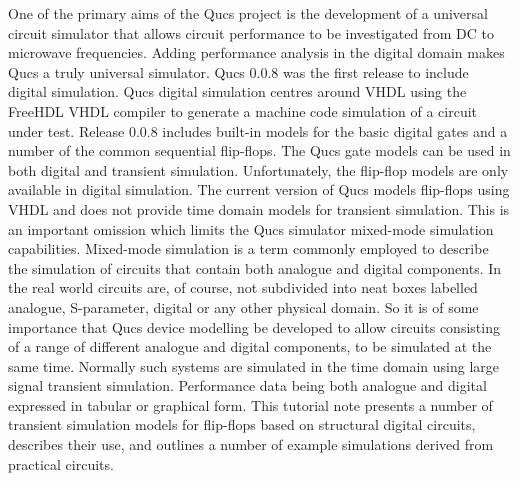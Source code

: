 %
%
%
%

\renewcommand{\thesubfigure}{\thefigure(\alph{subfigure})}
\makeatletter
  \renewcommand{\@thesubfigure}{\thesubfigure:\space}
  \renewcommand{\p@subfigure}{}
\makeatother

\renewcommand{\thesubtable}{\thetable(\alph{subtable})}
\makeatletter
  \renewcommand{\@thesubtable}{\thesubtable:\space}
  \renewcommand{\p@subtable}{}
\makeatother


One of the primary aims of the Qucs project is the development of a
universal circuit simulator that allows circuit performance to be
investigated from DC to microwave frequencies.  Adding performance
analysis in the digital domain makes Qucs a truly universal simulator.
Qucs 0.0.8 was the first release to include digital simulation.  Qucs
digital simulation centres around VHDL using the FreeHDL VHDL compiler
to generate a machine code si\-mu\-la\-tion of a circuit under
test. Release 0.0.8 includes built-in models for the basic digital
gates and a number of the common sequential flip-flops.  The Qucs gate
models can be used in both digital and transient simulation.
Unfortunately, the flip-flop models are only available in digital
simulation.  The current version of Qucs models flip-flops using VHDL
and does not provide time domain models for transient simulation. This
is an important omission which limits the Qucs simulator mixed-mode
simulation capabilities. Mixed-mode simulation is a term commonly
employed to describe the simulation of circuits that contain both
analogue and digital components.  In the real world circuits are, of
course, not subdivided into neat boxes labelled analogue, S-parameter,
digital or any other physical domain.  So it is of some importance
that Qucs device modelling be developed to allow circuits consisting
of a range of different analogue and digital components, to be
simulated at the same time.  Normally such systems are simulated in
the time domain using large signal transient simulation. Performance
data being both analogue and digital expressed in tabular or graphical
form.  This tutorial note presents a number of transient simulation
models for flip-flops based on structural digital circuits, describes
their use, and outlines a number of example simulations derived from
practical circuits.


